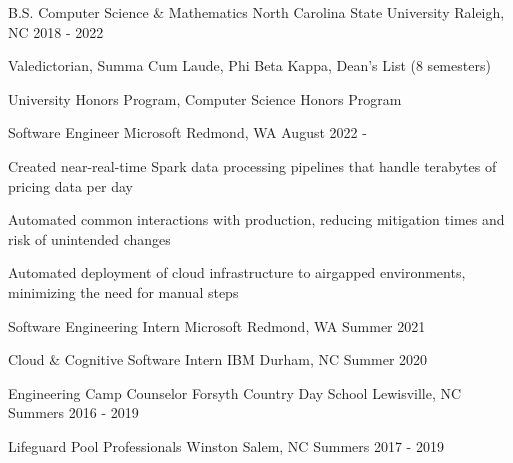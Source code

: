 \documentclass[a4paper]{awesome-cv}
\begin{document}
	
	\makecvheader

	\begin{cventries}
		\cventry
		{B.S. Computer Science \& Mathematics}		%
		{North Carolina State University} 			%
		{Raleigh, NC} 								%
		{2018 - 2022} 								%
		{
			\begin{cvitems}
				\item {Valedictorian, Summa Cum Laude, Phi Beta Kappa, Dean's List (8 semesters)}
				\item {University Honors Program, Computer Science Honors Program}
			\end{cvitems}
		}
	\end{cventries}

	\cvsection{Experience}
	
	\begin{cventries}
		\cventry
		{Software Engineer}	%
		{Microsoft} 		%
		{Redmond, WA} 		%
		{August 2022 -} 	%
		{
			\begin{cvitems} %
				\item {Created near-real-time Spark data processing pipelines that handle terabytes of pricing data per day}
				\item {Automated common interactions with production, reducing mitigation times and risk of unintended changes}
				\item {Automated deployment of cloud infrastructure to airgapped environments, minimizing the need for manual steps}
			\end{cvitems}
		}

		\cventry
		{Software Engineering Intern}	%
		{Microsoft} 					%
		{Redmond, WA} 					%
		{Summer 2021} 					%
		{}
	
		\cventry
		{Cloud \& Cognitive Software Intern}	%
		{IBM} 									%
		{Durham, NC} 							%
		{Summer 2020} 							%
		{}
	
		\cventry
		{Engineering Camp Counselor}	%
		{Forsyth Country Day School} 	%
		{Lewisville, NC} 				%
		{Summers 2016 - 2019} 			%
		{}
		
		\cventry
		{Lifeguard} 			%
		{Pool Professionals}	%
		{Winston Salem, NC} 	%
		{Summers 2017 - 2019} 	%
		{}
	\end{cventries}
	
\end{document}
